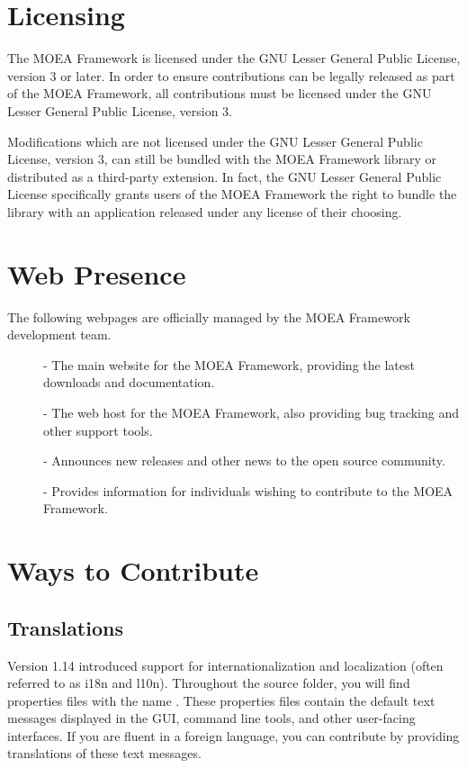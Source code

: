\section{Licensing}
The MOEA Framework is licensed under the GNU Lesser General Public License, version 3 or later.  In order to ensure contributions can be legally released as part of the MOEA Framework, all contributions must be licensed under the GNU Lesser General Public License, version 3.

Modifications which are not licensed under the GNU Lesser General Public License, version 3, can still be bundled with the MOEA Framework library or distributed as a third-party extension.  In fact, the GNU Lesser General Public License specifically grants users of the MOEA Framework the right to bundle the library with an application released under any license of their choosing.

\section{Web Presence}
The following webpages are officially managed by the MOEA Framework development team.

\begin{description}
  \item[] - The main website for the MOEA Framework, providing the latest downloads and documentation.
  \item[] - The web host for the MOEA Framework, also providing bug tracking and other support tools.
  \item[] - Announces new releases and other news to the open source community.
  \item[] - Provides information for individuals wishing to contribute to the MOEA Framework.
\end{description}

\section{Ways to Contribute}

\subsection{Translations}
Version 1.14 introduced support for internationalization and localization (often referred to as i18n and l10n).  Throughout the source folder, you will find properties files with the name .  These properties files contain the default text messages displayed in the GUI, command line tools, and other user-facing interfaces.  If you are fluent in a foreign language, you can contribute by providing translations of these text messages.

